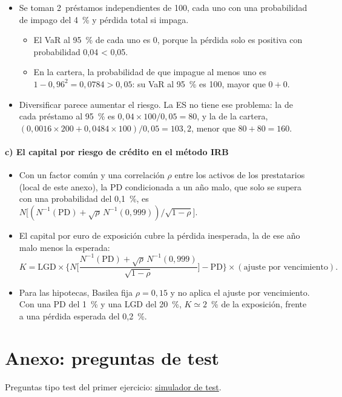 \documentclass[11pt]{article}
\begin{document}
\begin{itemize}
\item Se toman 2~préstamos independientes de 100, cada uno con una probabilidad de impago del 4~\% y pérdida total si impaga.
  \begin{itemize}
  \item El VaR al 95~\% de cada uno es 0, porque la pérdida solo es positiva con probabilidad 0,04 < 0,05.
  \item En la cartera, la probabilidad de que impague al menos uno es $1-0{,}96^2=0{,}0784>0{,}05$: su VaR al 95~\% es 100, mayor que $0+0$.
  \end{itemize}
\item Diversificar parece aumentar el riesgo. La ES no tiene ese problema: la de cada préstamo al 95~\% es $0{,}04\times100/0{,}05=80$, y la de la cartera, $(0{,}0016\times200+0{,}0484\times100)/0{,}05=103{,}2$, menor que $80+80=160$\nocite{ArtznerEtAl1999Coherent}. \findemo
\end{itemize}

\paragraph{c) El capital por riesgo de crédito en el método IRB}

\begin{itemize}
\item Con un factor común y una correlación $\rho$ entre los activos de los prestatarios (local de este anexo), la PD condicionada a un año malo, que solo se supera con una probabilidad del 0,1~\%, es $N\big[(N^{-1}(\mathrm{PD})+\sqrt{\rho}\,N^{-1}(0{,}999))/\sqrt{1-\rho}\big]$\nocite{Vasicek2002}.
\item El capital por euro de exposición cubre la pérdida inesperada, la de ese año malo menos la esperada\nocite{BCBS2017Basel3}:
  \[
  K=\mathrm{LGD}\times\Big\{N\Big[\frac{N^{-1}(\mathrm{PD})+\sqrt{\rho}\,N^{-1}(0{,}999)}{\sqrt{1-\rho}}\Big]-\mathrm{PD}\Big\}\times(\text{ajuste por vencimiento}).
  \]
\item Para las hipotecas, Basilea fija $\rho=0{,}15$ y no aplica el ajuste por vencimiento. Con una PD del 1~\% y una LGD del 20~\%, $K\simeq2$~\% de la exposición, frente a una pérdida esperada del 0,2~\%.
\end{itemize}

\section{Anexo: preguntas de test}\label{anexo:test}

\begin{anotaciones}
Preguntas tipo test del primer ejercicio: \href{https://www.victorgutierrezmarcos.es/oposicion/temario/primer-ejercicio/test/simulador.html?tema=3.B.26}{simulador de test}.
\end{anotaciones}


\bibliografia
\end{document}
